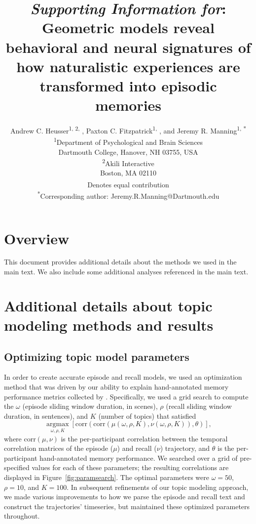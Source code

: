 \documentclass{article}
\title{\textit{Supporting Information for}: Geometric models reveal behavioral and neural signatures of how naturalistic experiences are transformed into episodic memories}
\author{Andrew C. Heusser\textsuperscript{1, 2, \textdagger}, Paxton C. Fitzpatrick\textsuperscript{1, \textdagger}, and Jeremy R. Manning\textsuperscript{1, *}\\\textsuperscript{1}Department of Psychological and Brain Sciences\\Dartmouth College, Hanover, NH 03755, USA\\\textsuperscript{2}Akili Interactive\\Boston, MA 02110\\\textsuperscript{\textdagger}Denotes equal contribution\\\textsuperscript{*}Corresponding author: Jeremy.R.Manning@Dartmouth.edu}
\newcommand{\argmax}{\mathop{\mathrm{argmax}}\limits}
\begin{document}
\maketitle

\setcounter{equation}{0}
\setcounter{figure}{0}
\setcounter{table}{0}
\setcounter{page}{1}
\setcounter{section}{0}
\makeatletter
\renewcommand{\theequation}{S\arabic{equation}}
\renewcommand{\thefigure}{S\arabic{figure}}
\renewcommand{\bibnumfmt}[1]{[S#1]}
\renewcommand{\citenumfont}[1]{S#1}


\section*{Overview}
This document provides additional details about the methods we used in the main text.  We also include some additional analyses referenced in the main text.

\section*{Additional details about topic modeling methods and results}
\subsection*{Optimizing topic model parameters}
In order to create accurate episode and recall models, we used an optimization method that was driven by our ability to explain hand-annotated memory performance metrics collected by \cite{ChenEtal17}.  Specifically, we used a grid search to compute the $\omega$ (episode sliding window duration, in scenes), $\rho$ (recall sliding window duration, in sentences), and $K$ (number of topics) that satisfied
\[
\argmax_{\omega, \rho, K} \left[\mathrm{corr}\left(\mathrm{corr}\left(\mu\left(\omega, \rho, K\right), \nu\left(\omega, \rho, K\right)\right), \theta\right)\right],
\]
where $\mathrm{corr}(\mu, \nu)$ is the per-participant correlation between the temporal correlation matrices of the episode ($\mu$) and recall ($\nu$) trajectory, and $\theta$ is the per-participant hand-annotated memory performance.  We searched over a grid of pre-specified values for each of these parameters; the resulting correlations are displayed in Figure~\ref{fig:paramsearch}.  The optimal parameters were $\omega = 50$, $\rho = 10$, and $K = 100$. In subsequent refinements of our topic modeling approach, we made various improvements to how we parse the episode and recall text and construct the trajectories' timeseries, but maintained these optimized parameters throughout.
\end{document}
